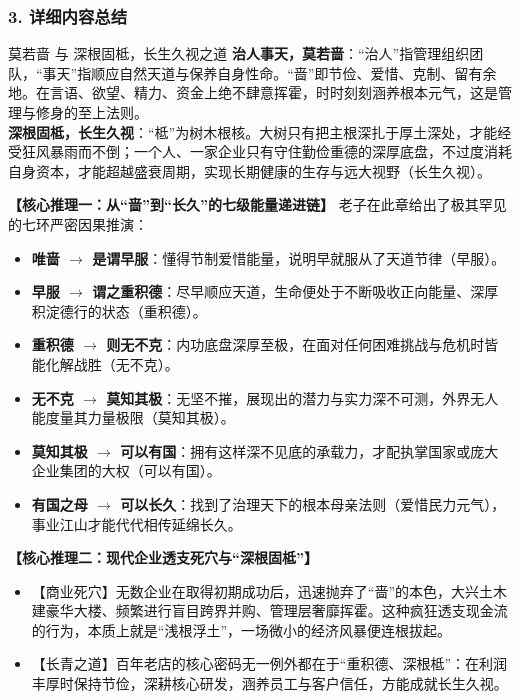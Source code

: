 \subsubsection{3. 详细内容总结}

\begin{ConceptBox}{莫若啬 与 深根固柢，长生久视之道}
\textbf{治人事天，莫若啬}：“治人”指管理组织团队，“事天”指顺应自然天道与保养自身性命。“啬”即节俭、爱惜、克制、留有余地。在言语、欲望、精力、资金上绝不肆意挥霍，时时刻刻涵养根本元气，这是管理与修身的至上法则。\\
\textbf{深根固柢，长生久视}：“柢”为树木根核。大树只有把主根深扎于厚土深处，才能经受狂风暴雨而不倒；一个人、一家企业只有守住勤俭重德的深厚底盘，不过度消耗自身资本，才能超越盛衰周期，实现长期健康的生存与远大视野（长生久视）。
\end{ConceptBox}

\noindent\textbf{【核心推理一：从“啬”到“长久”的七级能量递进链】}
老子在此章给出了极其罕见的七环严密因果推演：
\begin{itemize}
    \item \textbf{唯啬 $\rightarrow$ 是谓早服}：懂得节制爱惜能量，说明早就服从了天道节律（早服）。
    \item \textbf{早服 $\rightarrow$ 谓之重积德}：尽早顺应天道，生命便处于不断吸收正向能量、深厚积淀德行的状态（重积德）。
    \item \textbf{重积德 $\rightarrow$ 则无不克}：内功底盘深厚至极，在面对任何困难挑战与危机时皆能化解战胜（无不克）。
    \item \textbf{无不克 $\rightarrow$ 莫知其极}：无坚不摧，展现出的潜力与实力深不可测，外界无人能度量其力量极限（莫知其极）。
    \item \textbf{莫知其极 $\rightarrow$ 可以有国}：拥有这样深不见底的承载力，才配执掌国家或庞大企业集团的大权（可以有国）。
    \item \textbf{有国之母 $\rightarrow$ 可以长久}：找到了治理天下的根本母亲法则（爱惜民力元气），事业江山才能代代相传延绵长久。
\end{itemize}

\noindent\textbf{【核心推理二：现代企业透支死穴与“深根固柢”】}
\begin{itemize}
    \item 【商业死穴】无数企业在取得初期成功后，迅速抛弃了“啬”的本色，大兴土木建豪华大楼、频繁进行盲目跨界并购、管理层奢靡挥霍。这种疯狂透支现金流的行为，本质上就是“浅根浮土”，一场微小的经济风暴便连根拔起。
    \item 【长青之道】百年老店的核心密码无一例外都在于“重积德、深根柢”：在利润丰厚时保持节俭，深耕核心研发，涵养员工与客户信任，方能成就长生久视。
\end{itemize}

